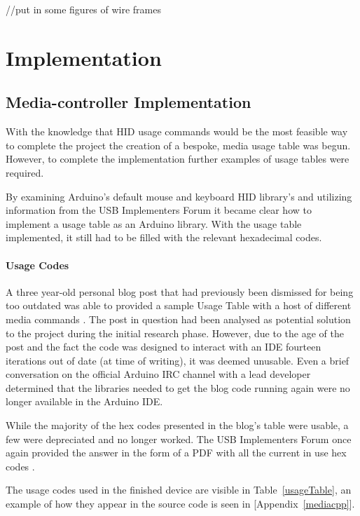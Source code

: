 \documentclass{article}
\begin{document}
			\noindent
			//put in some figures of wire frames

	\section{Implementation}
		\subsection{Media-controller Implementation}
			With the knowledge that HID usage commands would be the most feasible way to complete the project the creation of a bespoke, media usage table was begun. However, to complete the implementation further examples of usage tables were required.
			
			By examining Arduino's default mouse and keyboard HID library's \cite{ArduinoGit:online} and utilizing information from the USB Implementers Forum \cite{USBHID:online} it became clear how to implement a usage table as an Arduino library. With the usage table implemented, it still had to be filled with the relevant hexadecimal codes.
				
			\paragraph{Usage Codes}
			A three year-old personal blog post that had previously been dismissed for being too outdated was able to provided a sample Usage Table with a host of different media commands \cite{MediaBlog:online}. The post in question had been analysed as potential solution to the project during the initial research phase. However, due to the age of the post and the fact the code was designed to interact with an IDE fourteen iterations out of date (at time of writing), it was deemed unusable. Even a brief conversation on the official Arduino IRC channel with a lead developer determined that the libraries needed to get the blog code running again were no longer available in the Arduino IDE.
					
			While the majority of the hex codes presented in the blog's table were usable, a few were depreciated and no longer worked. The USB Implementers Forum once again provided the answer in the form of a PDF with all the current in use hex codes \cite{HIDUsagePage:online}.
			
			The usage codes used in the finished device are visible in Table~\ref{usageTable}, an example of how they appear in the source code is seen in [Appendix~\ref{mediacpp}]. 
			
\end{document}
